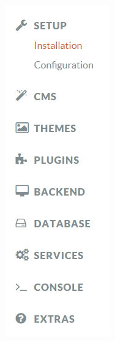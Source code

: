 \begin{figure}[!ht]
\begin{subfigure}[b]{0.20\textwidth}
  \includegraphics[width=\textwidth]{img/oc-documentation-sidebar.png}

\end{subfigure}
\end{figure}
